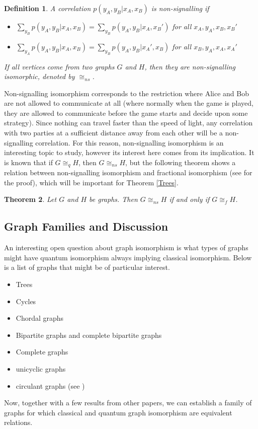 \documentclass[12pt]{article}
\newtheorem{thm}{Theorem}[section]
\newtheorem{defn}[thm]{Definition}
\begin{document}
\begin{defn}
  A correlation $p(y_A, y_B | x_A, x_B)$ is non-signalling if
  \begin{itemize}
  \item $\sum_{y_B}p(y_A, y_B | x_A, x_B) = \sum_{y_B}p(y_A, y_B |
    x_A, x_B')$ for all $x_A, y_A, x_B, x_B'$
  \item $\sum_{y_A}p(y_A, y_B | x_A, x_B) = \sum_{y_B}p(y_A, y_B |
    x_A', x_B)$ for all $x_B, y_A, x_A, x_A'$
  \end{itemize}
  If all vertices come from two graphs $G$ and $H$, then they are
  non-signalling isomorphic, denoted by $\cong_{ns}$.
\end{defn}

Non-signalling isomorphism corresponds to the restriction where Alice
and Bob are not allowed to communicate at all (where normally when the
game is played, they are allowed to communicate before the game starts
and decide upon some strategy). Since nothing can travel faster than
the speed of light, any correlation with two parties at a sufficient
distance away from each other will be a non-signalling
correlation. For this reason, non-signalling isomorphism is an
interesting topic to study, however its interest here comes from its
implication. It is known that if $G \cong_q H$, then $G \cong_{ns}H$,
but the following theorem shows a relation between non-signalling
isomorphism and fractional isomorphism (see \cite{laura} for the
proof), which will be important for Theorem \ref{Trees}.

\begin{thm}
  Let $G$ and $H$ be graphs. Then $G \cong_{ns} H$ if and only if $G
  \cong_f H$.
\end{thm}

\subsection{Graph Families and Discussion}

An interesting open question about graph isomorphism is what types of
graphs might have quantum isomorphism always implying classical
isomorphism. Below is a list of graphs that might be of particular
interest.
\begin{itemize}
\item Trees
\item Cycles
\item Chordal graphs
\item Bipartite graphs and complete bipartite graphs
\item Complete graphs 
\item unicyclic graphs
\item circulant graphs (see \cite{circulant})
\end{itemize}
Now, together with a few results from other papers, we can establish a
family of graphs for which classical and quantum graph isomorphism are
equivalent relations.
\end{document}
